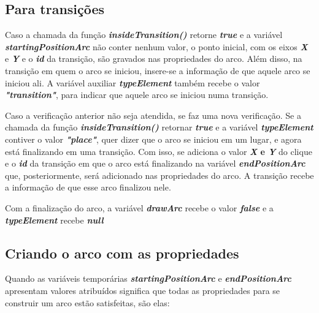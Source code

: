 \documentclass[
	12pt,				%
	openright,			%
	oneside,			%
	a4paper,			%
	english,			%
	brazil				%
	]{abntex2}
\begin{document}


\subsection*{Para transições}

Caso a chamada da função \textbf{\textit{insideTransition()}} retorne \textbf{\textit{true}} e a variável \textbf{\textit{startingPositionArc}} não conter nenhum valor, o ponto inicial, com os eixos \textbf{\textit{X}} e \textbf{\textit{Y}} e o \textbf{\textit{id}} da transição, são gravados nas propriedades do arco. Além disso, na transição em quem o arco se iniciou, insere-se a informação de que aquele arco se iniciou ali. A variável auxiliar \textbf{\textit{typeElement}} também recebe o valor \textbf{\textit{"transition"}}, para indicar que aquele arco se iniciou numa transição. 

Caso a verificação anterior não seja atendida, se faz uma nova verificação. Se a chamada da função \textbf{\textit{insideTransition()}} retornar \textbf{\textit{true}} e a variável \textbf{\textit{typeElement}} contiver o valor \textbf{\textit{"place"}}, quer dizer que o arco se iniciou em um lugar, e agora está finalizando em uma transição. Com isso, se adiciona o valor \textbf{\textit{X} e \textbf{\textit{Y}}} do clique e o \textbf{\textit{id}} da transição em que o arco está finalizando na variável \textbf{\textit{endPositionArc}} que, posteriormente, será adicionado nas propriedades do arco. A transição recebe a informação de que esse arco finalizou nele.

Com a finalização do arco, a variável \textbf{\textit{drawArc}} recebe o valor \textbf{\textit{false}} e a \textbf{\textit{typeElement}} recebe \textbf{\textit{null}}



\subsection*{Criando o arco com as propriedades}

Quando as variáveis temporárias \textbf{\textit{startingPositionArc}} e \textbf{\textit{endPositionArc}} apresentam valores atribuídos significa que todas as propriedades para se construir um arco estão satisfeitas, são elas:
\end{document}

